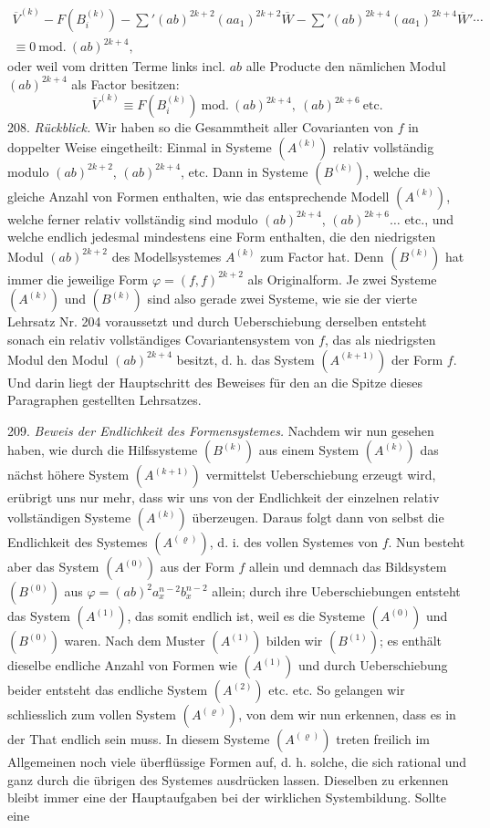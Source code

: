\[
\begin{gathered}
\overline{V}^{(k)} - F(B_i^{(k)}) - \sum{}'(ab)^{2k+2}(aa_1)^{2k+2}\overline{W} - \sum{}'(ab)^{2k+4}(aa_1)^{2k+4}\overline{W}' \cdots \\
\equiv 0 \ \mathrm{mod.}\ (ab)^{2k+4},
\end{gathered}
\]
oder weil vom dritten Terme links incl. $ab$ alle Producte den nämlichen
 Modul $(ab)^{2k+4}$ als Factor besitzen:
\[
\overline{V}^{(k)} \equiv F(B_i^{(k)}) \ \mathrm{mod.}\ (ab)^{2k+4},\ (ab)^{2k+6}\ \text{etc.}
\]
208. \textit{Rückblick.} Wir haben so die Gesammtheit aller Covarianten
von $f$ in doppelter Weise eingetheilt: Einmal in Systeme $(A^{(k)})$ relativ
vollständig modulo $(ab)^{2k+2}$, $(ab)^{2k+4}$, etc. Dann in Systeme $(B^{(k)})$,
welche die gleiche Anzahl von Formen enthalten, wie das
entsprechende Modell $(A^{(k)})$, welche ferner relativ vollständig sind
modulo $(ab)^{2k+4}$, $(ab)^{2k+6} \ldots$ etc., und welche endlich jedesmal mindestens
eine Form enthalten, die den niedrigsten Modul $(ab)^{2k+2}$ des Modellsystemes
 $A^{(k)}$ zum Factor hat. Denn $(B^{(k)})$ hat immer die jeweilige
Form $\varphi = (f,f)^{2k+2}$ als Originalform. Je zwei Systeme $(A^{(k)})$ und
$(B^{(k)})$ sind also gerade zwei Systeme, wie sie der vierte Lehrsatz
Nr. 204 voraussetzt und durch Ueberschiebung derselben entsteht
sonach ein relativ vollständiges Covariantensystem von $f$, das als
niedrigsten Modul den Modul $(ab)^{2k+4}$ besitzt, d. h. das System
$(A^{(k+1)})$ der Form $f$. Und darin liegt der Hauptschritt des Beweises für
den an die Spitze dieses Paragraphen gestellten Lehrsatzes.

209. \textit{Beweis der Endlichkeit des Formensystemes.} Nachdem wir
nun gesehen haben, wie durch die Hilfssysteme $(B^{(k)})$ aus einem System
$(A^{(k)})$ das nächst höhere System $(A^{(k+1)})$ vermittelst Ueberschiebung
erzeugt wird, erübrigt uns nur mehr, dass wir uns von der Endlichkeit
 der einzelnen relativ vollständigen Systeme $(A^{(k)})$ überzeugen.
Daraus folgt dann von selbst die Endlichkeit des Systemes $(A^{(\varrho)})$,
d. i. des vollen Systemes von $f$. Nun besteht aber das System $(A^{(0)})$
aus der Form $f$ allein und demnach das Bildsystem $(B^{(0)})$ aus
$\varphi = (ab)^2 a_x^{n-2} b_x^{n-2}$ allein; durch ihre Ueberschiebungen entsteht das
System $(A^{(1)})$, das somit endlich ist, weil es die Systeme $(A^{(0)})$ und
$(B^{(0)})$ waren. Nach dem Muster $(A^{(1)})$ bilden wir $(B^{(1)})$; es enthält
dieselbe endliche Anzahl von Formen wie $(A^{(1)})$ und durch Ueberschiebung
 beider entsteht das endliche System $(A^{(2)})$ etc. etc. So gelangen
 wir schliesslich zum vollen System $(A^{(\varrho)})$, von dem wir nun
erkennen, dass es in der That endlich sein muss. In diesem Systeme
$(A^{(\varrho)})$ treten freilich im Allgemeinen noch viele überflüssige Formen
auf, d. h. solche, die sich rational und ganz durch die übrigen des
Systemes ausdrücken lassen. Dieselben zu erkennen bleibt immer eine
der Hauptaufgaben bei der wirklichen Systembildung. Sollte eine


